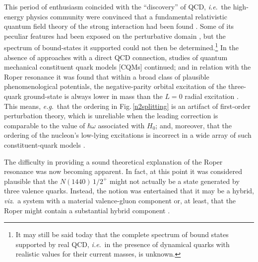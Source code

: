 This period of enthusiasm coincided with the ``discovery'' of QCD, \emph{i.e}.\ the high-energy physics community were convinced that a fundamental relativistic quantum field theory of the strong interaction had been found \cite{Marciano:1977su, Marciano:1979wa}.  Some of its peculiar features had been exposed on the perturbative domain \cite{Politzer:2005kc, Wilczek:2005az, Gross:2005kv}, but the spectrum of bound-states it supported could not then be determined.\footnote{
It may still be said today that the complete spectrum of bound states supported by real QCD, \emph{i.e}.\ in the presence of dynamical quarks with realistic values for their current masses, is unknown.
}
In the absence of approaches with a direct QCD connection, studies of quantum mechanical constituent quark models [CQMs] continued; and in relation with the Roper resonance it was found that within a broad class of plausible phenomenological potentials, the negative-parity orbital excitation of the three-quark ground-state is always lower in mass than the $L=0$ radial excitation \cite{Hogaasen:1982rb, Richard:1992uk}.  This means, \emph{e.g}.\  that the ordering in Fig.\,\ref{n2splitting} is an artifact of first-order perturbation theory, which is unreliable when the leading correction is comparable to the value of $\hbar \omega$ associated with $H_0$; and, moreover, that the ordering of the nucleon's low-lying excitations is incorrect in a wide array of such constituent-quark models \cite{Capstick:2000qj, Crede:2013sze, Giannini:2015zia}.

The difficulty in providing a sound theoretical explanation of the Roper resonance was now becoming apparent.  In fact, at this point it was considered plausible that the $N(1440)\,1/2^+$ might not actually be a state generated by three valence quarks.  Instead, the notion was entertained that it may be a hybrid, \emph{viz}.\ a system with a material valence-gluon component or, at least, that the Roper might contain a substantial hybrid component \cite{Barnes:1982fj, Li:1991yba, Capstick:2002wm}. %

